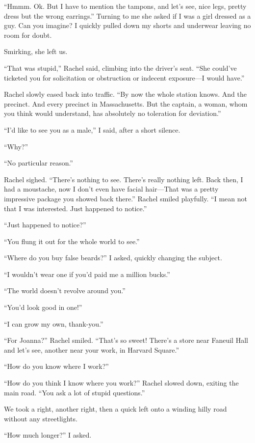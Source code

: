 ``Hmmm. Ok. But I have to mention the tampons, and let's see, nice legs,
pretty dress but the wrong earrings.'' Turning to me she asked if I was
a girl dressed as a guy. Can you imagine? I quickly pulled down my
shorts and underwear leaving no room for doubt.

Smirking, she left us.

``That was stupid,'' Rachel said, climbing into the driver's seat. ``She
could've ticketed you for solicitation or obstruction or indecent
exposure---I would have.''

Rachel slowly eased back into traffic. ``By now the whole station knows.
And the precinct. And every precinct in Massachusetts. But the captain,
a woman, whom you think would understand, has absolutely no toleration
for deviation.''

``I'd like to see you as a male,'' I said, after a short silence.

``Why?''

``No particular reason.''

Rachel sighed. ``There's nothing to see. There's really nothing left.
Back then, I had a moustache, now I don't even have facial hair---That
was a pretty impressive package you showed back there.'' Rachel smiled
playfully. ``I mean not that I was interested. Just happened to
notice.''

``Just happened to notice?''

``You flung it out for the whole world to see.''

``Where do you buy false beards?'' I asked, quickly changing the
subject.

``I wouldn't wear one if you'd paid me a million bucks.''

``The world doesn't revolve around you.''

``You'd look good in one!''

``I can grow my own, thank-you.''

``For Joanna?'' Rachel smiled. ``That's so sweet! There's a store near
Faneuil Hall and let's see, another near your work, in Harvard Square.''

``How do you know where I work?''

``How do you think I know where you work?'' Rachel slowed down, exiting
the main road. ``You ask a lot of stupid questions.''

We took a right, another right, then a quick left onto a winding hilly
road without any streetlights.

``How much longer?'' I asked.

